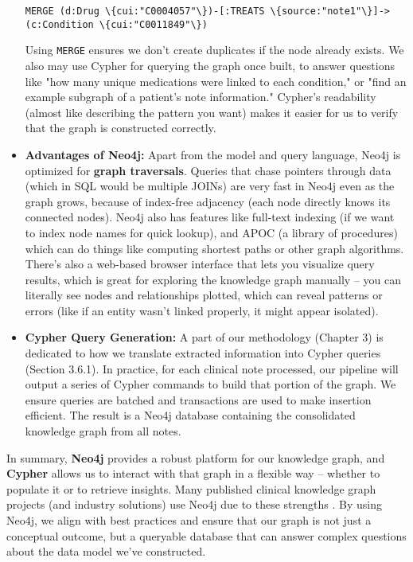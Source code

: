 \begin{itemize}
\begin{verbatim}
MERGE (d:Drug \{cui:"C0004057"\})-[:TREATS \{source:"note1"\}]->
(c:Condition \{cui:"C0011849"\})
\end{verbatim}

Using \texttt{MERGE} ensures we don't create duplicates if the node already exists. We also may use Cypher for querying the graph once built, to answer questions like "how many unique medications were linked to each condition," or "find an example subgraph of a patient's note information." Cypher's readability (almost like describing the pattern you want) makes it easier for us to verify that the graph is constructed correctly.

\item \textbf{Advantages of Neo4j:} Apart from the model and query language, Neo4j is optimized for \textbf{graph traversals}. Queries that chase pointers through data (which in SQL would be multiple JOINs) are very fast in Neo4j even as the graph grows, because of index-free adjacency (each node directly knows its connected nodes). Neo4j also has features like full-text indexing (if we want to index node names for quick lookup), and APOC (a library of procedures) which can do things like computing shortest paths or other graph algorithms. There's also a web-based browser interface that lets you visualize query results, which is great for exploring the knowledge graph manually – you can literally see nodes and relationships plotted, which can reveal patterns or errors (like if an entity wasn't linked properly, it might appear isolated).

\item \textbf{Cypher Query Generation:} A part of our methodology (Chapter 3) is dedicated to how we translate extracted information into Cypher queries (Section 3.6.1). In practice, for each clinical note processed, our pipeline will output a series of Cypher commands to build that portion of the graph. We ensure queries are batched and transactions are used to make insertion efficient. The result is a Neo4j database containing the consolidated knowledge graph from all notes.
\end{itemize}

In summary, \textbf{Neo4j} provides a robust platform for our knowledge graph, and \textbf{Cypher} allows us to interact with that graph in a flexible way – whether to populate it or to retrieve insights. Many published clinical knowledge graph projects (and industry solutions) use Neo4j due to these strengths \cite{Zimbres2024}. By using Neo4j, we align with best practices and ensure that our graph is not just a conceptual outcome, but a queryable database that can answer complex questions about the data model we've constructed.

